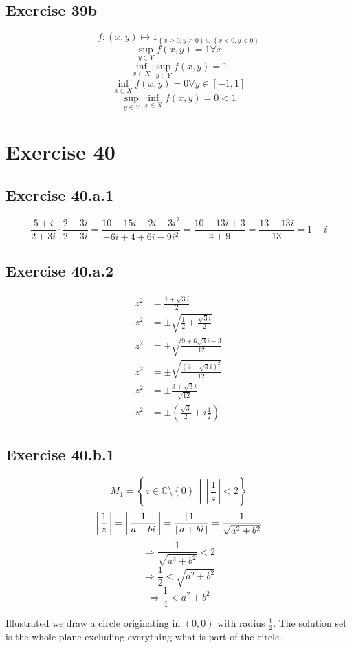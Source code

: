 \documentclass[a4paper]{article}
\theoremstyle{definition}
\newcommand\abs[1]{\left|\thinspace #1\thinspace\right|}
\newcommand\set[1]{\left\{#1\right\}}
\newcommand\setdef[2]{\left\{#1\,\middle|\,#2\right\}}
\newcommand\card[1]{\left|\,#1\,\right|}
\begin{document}
\subsection{Exercise 39b}
\[ f: (x, y) \mapsto 1_{\set{ x \geq 0, y \geq 0} \cup \set{x < 0, y < 0}} \]
\[ \sup_{y \in Y} f(x, y) = 1 \forall x \]
\[ \inf_{x \in X} \sup_{y \in Y} f(x, y) = 1 \]
\[ \inf_{x \in X} f(x, y) = 0 \forall y \in [-1, 1] \]
\[ \sup_{y \in Y} \inf_{x \in X} f(x, y) = 0 < 1 \]

\section{Exercise 40}

\subsection{Exercise 40.a.1}
\[
    \frac{5+i}{2+3i} \cdot \frac{2 - 3i}{2 - 3i}
    = \frac{10 - 15i + 2i - 3i^2}{-6i + 4 + 6i - 9i^2}
    = \frac{10 - 13i + 3}{4 + 9}
    = \frac{13 - 13i}{13}
    = 1 - i
\]

\subsection{Exercise 40.a.2}
\begin{align*}
  z^2 &= \frac{1 + \sqrt{3}i}{2} \\
  z^2 &= \pm \sqrt{\frac12 + \frac{\sqrt{3}i}{2}} \\
  z^2 &= \pm \sqrt{\frac{9 + 6\sqrt{3} i - 3}{12}} \\
  z^2 &= \pm \sqrt{\frac{(3 + \sqrt{3}i)^2}{12}} \\
  z^2 &= \pm \frac{3 + \sqrt{3}i}{\sqrt{12}} \\
  z^2 &= \pm \left(\frac{\sqrt{3}}{2} + i\frac12\right)
\end{align*}

\subsection{Exercise 40.b.1}
\[ M_1 = \setdef{z \in \mathbb C \setminus \set{0}}{\card{\frac1z} < 2} \]
\[
    \abs{\frac1z}
    = \abs{\frac1{a + bi}}
    = \frac{\abs{1}}{\abs{a + bi}}
    = \frac{1}{\sqrt{a^2 + b^2}}
\] \[
    \Rightarrow \frac{1}{\sqrt{a^2 + b^2}} < 2
\] \[
    \Rightarrow \frac12 < \sqrt{a^2 + b^2}
\] \[
    \Rightarrow \frac14 < a^2 + b^2
\]

Illustrated we draw a circle originating in $(0, 0)$ with radius $\frac12$.
The solution set is the whole plane excluding everything what is part of the circle.
\end{document}
